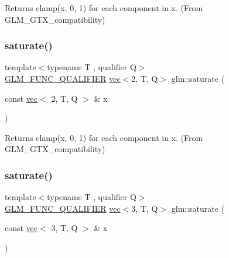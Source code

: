 Returns clamp(x, 0, 1) for each component in x. (From G\+L\+M\+\_\+\+G\+T\+X\+\_\+compatibility) 

\mbox{\label{group__gtx__compatibility_gaee97b8001c794a78a44f5d59f62a8aba}} 
\subsubsection{\texorpdfstring{saturate()}{saturate()}\hspace{0.1cm}{\footnotesize\ttfamily [2/4]}}
{\footnotesize\ttfamily template$<$typename T , qualifier Q$>$ \\
\mbox{\hyperlink{setup_8hpp_a33fdea6f91c5f834105f7415e2a64407}{G\+L\+M\+\_\+\+F\+U\+N\+C\+\_\+\+Q\+U\+A\+L\+I\+F\+I\+ER}} \mbox{\hyperlink{structglm_1_1vec}{vec}}$<$2, T, Q$>$ glm\+::saturate (\begin{DoxyParamCaption}\item[{const \mbox{\hyperlink{structglm_1_1vec}{vec}}$<$ 2, T, Q $>$ \&}]{x }\end{DoxyParamCaption})}



Returns clamp(x, 0, 1) for each component in x. (From G\+L\+M\+\_\+\+G\+T\+X\+\_\+compatibility) 

\mbox{\label{group__gtx__compatibility_ga39bfe3a421286ee31680d45c31ccc161}} 
\subsubsection{\texorpdfstring{saturate()}{saturate()}\hspace{0.1cm}{\footnotesize\ttfamily [3/4]}}
{\footnotesize\ttfamily template$<$typename T , qualifier Q$>$ \\
\mbox{\hyperlink{setup_8hpp_a33fdea6f91c5f834105f7415e2a64407}{G\+L\+M\+\_\+\+F\+U\+N\+C\+\_\+\+Q\+U\+A\+L\+I\+F\+I\+ER}} \mbox{\hyperlink{structglm_1_1vec}{vec}}$<$3, T, Q$>$ glm\+::saturate (\begin{DoxyParamCaption}\item[{const \mbox{\hyperlink{structglm_1_1vec}{vec}}$<$ 3, T, Q $>$ \&}]{x }\end{DoxyParamCaption})}



